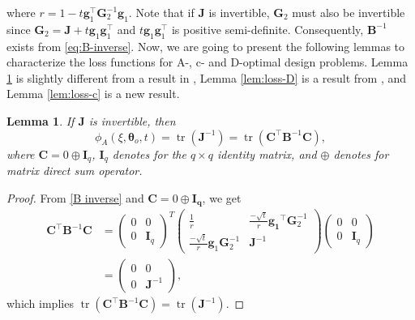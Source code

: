 \documentclass[
]{book}
\newtheorem{lemma}{Lemma}[chapter]
\theoremstyle{definition}
\theoremstyle{definition}
\theoremstyle{definition}
\theoremstyle{definition}
\theoremstyle{remark}
\begin{document}
where \(r=1-t\boldsymbol{g}_1^\top\boldsymbol{G}_2^{-1}\boldsymbol{g}_1\). Note that if \(\boldsymbol{J}\) is invertible, \(\boldsymbol{G}_2\) must also be invertible since \(\boldsymbol{G}_2=\boldsymbol{J}+t\boldsymbol{g}_1\boldsymbol{g}_1^\top\) and \(t\boldsymbol{g}_1\boldsymbol{g}_1^\top\) is positive semi-definite. Consequently, \(\boldsymbol{B}^{-1}\) exists from \eqref{eq:B-inverse}. Now, we are going to present the following lemmas to characterize the loss functions for A-, c- and D-optimal design problems. Lemma \ref{lem:loss-A} is slightly different from a result in \citet{yin2018optimal}, Lemma \ref{lem:loss-D} is a result from \citet{gao2017d}, and Lemma \ref{lem:loss-c} is a new result.

\begin{lemma}
\protect\hypertarget{lem:loss-A}{}\label{lem:loss-A}If \(\boldsymbol{J}\) is invertible, then
\begin{equation*}
  \phi_A(\xi,\boldsymbol{\theta}_o,t)=\operatorname{tr}(\boldsymbol{J}^{-1})=\operatorname{tr}(\boldsymbol{C}^\top\boldsymbol{B}^{-1}\boldsymbol{C}),
  \end{equation*}
where \(\boldsymbol{C}=0\oplus \boldsymbol{I}_q\), \(\boldsymbol{I}_q\) denotes for the \(q\times q\) identity matrix, and \(\oplus\) denotes for matrix direct sum operator.
\end{lemma}

\begin{proof}
From \eqref{B inverse} and \(\boldsymbol{C}=0\oplus \boldsymbol{I_q}\), we get
\begin{align*}
    \boldsymbol{C}^\top\boldsymbol{B}^{-1}\boldsymbol{C}&=  \begin{pmatrix}
                                0   &   0\\
                                0   &   \boldsymbol{I}_q
                                \end{pmatrix}^T\begin{pmatrix}
            \frac{1}{r}             &   \frac{-\sqrt{t}}{r}\boldsymbol{g_1}^\top\boldsymbol{G}_2^{-1}   \\
            \frac{-\sqrt{t}}{r}\boldsymbol{g}_1\boldsymbol{G}_2^{-1}    &\boldsymbol{J}^{-1}
            \end{pmatrix}\begin{pmatrix}
                                0   &   0\\
                                0   &   \boldsymbol{I}_q
                                \end{pmatrix}\\
                            &= \begin{pmatrix}
                                0   &   0\\
                                0   &   \boldsymbol{J}^{-1}
                                \end{pmatrix},
    \end{align*}
which implies \(\operatorname{tr}(\boldsymbol{C}^\top\boldsymbol{B}^{-1}\boldsymbol{C})=\operatorname{tr}(\boldsymbol{J}^{-1})\).
\end{proof}
\end{document}
